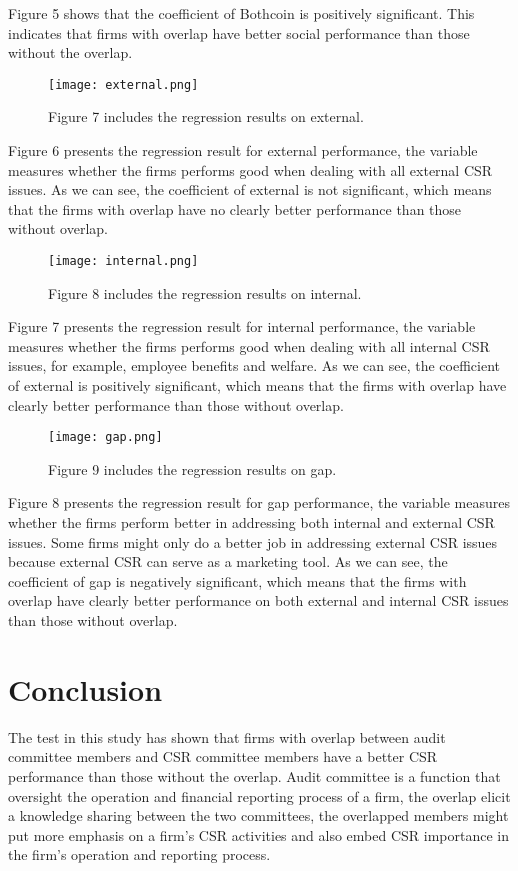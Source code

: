 \documentclass{article}
\begin{document}
Figure 5 shows that the coefficient of Bothcoin is positively significant. This indicates that firms with overlap have better social performance than those without the overlap.

\begin{figure}
\centering
\texttt{[image: external.png]}
\caption{\label{fig:external} Figure 7 includes the regression results on external.}
\end{figure}

Figure 6 presents the regression result for external performance, the variable measures whether the firms performs good when dealing with all external CSR issues. As we can see, the coefficient of external is not significant, which means that the firms with overlap have no clearly better performance than those without overlap.

\begin{figure}
\centering
\texttt{[image: internal.png]}
\caption{\label{fig:internal} Figure 8 includes the regression results on internal.}
\end{figure}

Figure 7 presents the regression result for internal performance, the variable measures whether the firms performs good when dealing with all internal CSR issues, for example, employee benefits and welfare. As we can see, the coefficient of external is positively significant, which means that the firms with overlap have clearly better performance than those without overlap.

\begin{figure}
\centering
\texttt{[image: gap.png]}
\caption{\label{fig:gap} Figure 9 includes the regression results on gap.}
\end{figure}

Figure 8 presents the regression result for gap performance, the variable measures whether the firms perform better in addressing both internal and external CSR issues. Some firms might only do a better job in addressing external CSR issues because external CSR can serve as a marketing tool.  As we can see, the coefficient of gap is negatively significant, which means that the firms with overlap have clearly better performance on both external and internal CSR issues than those without overlap.



\section{Conclusion}

The test in this study has shown that firms with overlap between audit committee members and CSR committee members have a better CSR performance than those without the overlap. Audit committee is a function that oversight the operation and financial reporting process of a firm, the overlap elicit a knowledge sharing between the two committees, the overlapped members might put more emphasis on a firm's CSR activities and also embed CSR importance in the firm's operation and reporting process.





\end{document}
